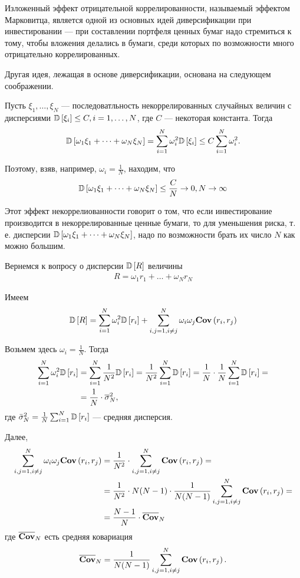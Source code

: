 Изложенный эффект отрицательной коррелированности, называемый эффектом Марковитца, является одной из основных идей диверсификации при инвестировании ---
при составлении портфеля ценных бумаг надо стремиться к тому, чтобы вложения делались в бумаги, среди которых по возможности много отрицательно коррелированных.

Другая идея, лежащая в основе диверсификации, основана на следующем соображении.

Пусть $\xi_1, \dots, \xi_N$ --- последоватльность некоррелированных случайных величин с дисперсиями $\mathbb{D}\left[\xi_i\right] \le C, i=1, \dots, N$, 
где $C$ --- некоторая константа. Тогда
\begin{align}
\mathbb{D}\left[\omega_1 \xi_1 + \dots + \omega_N \xi_N\right] = \sum_{i=1}^{N} \omega_i^2 \mathbb{D}\left[\xi_i\right] \le C \sum_{i=1}^{N} \omega_i^2 .
\end{align}

Поэтому, взяв, например, $\omega_i = \frac{1}{N}$, находим, что
\begin{align}
\mathbb{D}\left[\omega_1 \xi_1 + \dots + \omega_N \xi_N\right] \le \frac{C}{N} \rightarrow 0, N \rightarrow \infty
\end{align}

Этот эффект некоррелиованности говорит о том, что если инвестирование производится в некоррелированные ценные бумаги, то для уменьшения риска,
т. е. дисперсии $\mathbb{D}\left[\omega_1 \xi_1 + \dots + \omega_N \xi_N\right]$, надо по возможности брать их число $N$ как можно большим.

Вернемся к вопросу о дисперсии $\mathbb{D}\left[R\right]$ величины
\begin{align}
	R = \omega_1 r_1 + \dots + \omega_N r_N
\end{align}

Имеем
\begin{align}
	\mathbb{D}\left[R\right] = \sum_{i=1}^{N} \omega_i^2 \mathbb{D}\left[r_i\right] + \sum_{i, j = 1, i \ne j}^{N} \omega_i \omega_j \textbf{Cov}\left(r_i, r_j\right)
\end{align}

Возьмем здесь $\omega_i = \frac{1}{N}$. Тогда
\begin{align}
	\sum_{i=1}^{N} \omega_i^2 \mathbb{D}\left[r_i\right]
	&= \sum_{i=1}^{N} \frac{1}{N^2} \mathbb{D}\left[r_i\right]
	= \frac{1}{N^2} \sum_{i=1}^{N} \mathbb{D}\left[r_i\right]
	= \frac{1}{N} \cdot \frac{1}{N} \sum_{i=1}^{N} \mathbb{D}\left[r_i\right] = \\
	&= \frac{1}{N} \cdot \overline{\sigma}_N^2 ,
\end{align}
где $\bar{\sigma}_N^2 = \frac{1}{N} \sum_{i=1}^{N} \mathbb{D}\left[r_i\right]$ --- средняя дисперсия. 

Далее,
\begin{align}
	\sum_{i, j = 1, i \ne j}^{N} \omega_i \omega_j \textbf{Cov}\left(r_i, r_j\right)
	&= \frac{1}{N^2} \cdot \sum_{i, j = 1, i \ne j}^{N} \textbf{Cov}\left(r_i, r_j\right) = \\
	&= \frac{1}{N^2} \cdot N (N-1) \cdot \frac{1}{N (N-1)} \sum_{i, j = 1, i \ne j}^{N} \textbf{Cov}\left(r_i, r_j\right) = \\
	&= \frac{N-1}{N} \cdot \overline{\textbf{Cov}}_N
\end{align}
где $\overline{\textbf{Cov}}_N$ есть средняя ковариация
\begin{align}
\overline{\textbf{Cov}}_N = \frac{1}{N (N - 1)} \sum_{i, j = 1, i \ne j}^{N} \textbf{Cov}\left(r_i, r_j\right) .
\end{align}

